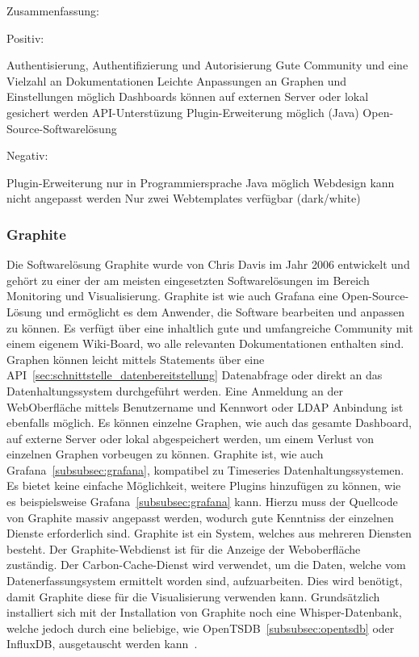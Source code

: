 Zusammenfassung:

Positiv:

\begin{outline}
  \1 Authentisierung, Authentifizierung und Autorisierung
  \1 Gute Community und eine Vielzahl an Dokumentationen
  \1 Leichte Anpassungen an Graphen und Einstellungen möglich
  \1 Dashboards können auf externen Server oder lokal gesichert werden
  \1 API-Unterstüzung
  \1 Plugin-Erweiterung möglich (Java)
  \1 Open-Source-Softwarelösung
\end{outline}

Negativ:

\begin{outline}
  \1 Plugin-Erweiterung nur in Programmiersprache Java möglich
  \1 Webdesign kann nicht angepasst werden
  \1 Nur zwei Webtemplates verfügbar (dark/white)
\end{outline}

\subsubsection{Graphite}
\label{subsubsec:graphite}
Die Softwarelösung Graphite wurde von Chris Davis im Jahr 2006 entwickelt und
gehört zu einer der am meisten eingesetzten Softwarelösungen im Bereich
Monitoring und Visualisierung. Graphite ist wie auch Grafana eine
Open-Source-Lösung und ermöglicht es dem Anwender, die Software bearbeiten und
anpassen zu können. Es verfügt über eine inhaltlich gute und umfangreiche
Community mit einem eigenem Wiki-Board, wo alle relevanten Dokumentationen
enthalten sind.  Graphen können leicht mittels Statements über eine
API~\ref{sec:schnittstelle_datenbereitstellung} Datenabfrage oder direkt an das
Datenhaltungssystem durchgeführt werden. Eine Anmeldung an der WebOberfläche
mittels Benutzername und Kennwort oder \gls{LDAP} Anbindung ist ebenfalls
möglich. Es können einzelne Graphen, wie auch das gesamte Dashboard, auf
externe Server oder lokal abgespeichert werden, um einem Verlust von einzelnen
Graphen vorbeugen zu können. Graphite ist, wie auch
Grafana~\ref{subsubsec:grafana}, kompatibel zu Timeseries
Datenhaltungssystemen. Es bietet keine einfache Möglichkeit, weitere Plugins
hinzufügen zu können, wie es beispielsweise Grafana~\ref{subsubsec:grafana}
kann. Hierzu muss der Quellcode von Graphite massiv angepasst werden, wodurch
gute Kenntniss der einzelnen Dienste erforderlich sind. Graphite ist ein
System, welches aus mehreren Diensten besteht. Der Graphite-Webdienst ist für
die Anzeige der Weboberfläche zuständig. Der Carbon-Cache-Dienst wird
verwendet, um die Daten, welche vom Datenerfassungsystem ermittelt worden sind,
aufzuarbeiten. Dies wird benötigt, damit Graphite diese für die Visualisierung
verwenden kann. Grundsätzlich installiert sich mit der Installation von
Graphite noch eine Whisper-Datenbank, welche jedoch durch eine beliebige, wie
OpenTSDB~\ref{subsubsec:opentsdb} oder InfluxDB, ausgetauscht werden
kann~\cite{graphite}.


